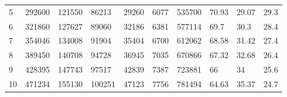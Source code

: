 \begin{landscape}
\begin{table}[tbp]
{\begin{tabular}{@{}llllllllll@{}}
5           & 292600                                                                       & 121550                                                                    & 86213               & 29260                                                                     & 6077                                                                    & 535700       & 70.93                    & 29.07                    & 29.3                           \\
6           & 321860                                                                       & 127627                                                                    & 89060               & 32186                                                                     & 6381                                                                    & 577114       & 69.7                     & 30.3                     & 28.4                           \\
7           & 354046                                                                       & 134008                                                                    & 91904               & 35404                                                                     & 6700                                                                    & 612062       & 68.58                    & 31.42                    & 27.4                           \\
8           & 389450                                                                       & 140708                                                                    & 94728               & 36945                                                                     & 7035                                                                    & 670866       & 67.32                    & 32.68                    & 26.4                           \\
9           & 428395                                                                       & 147743                                                                    & 97517               & 42839                                                                     & 7387                                                                    & 723881       & 66                       & 34                       & 25.6                           \\
10          & 471234                                                                       & 155130                                                                    & 100251              & 47123                                                                     & 7756                                                                    & 781494       & 64.63                    & 35.37                    & 24.7                           \\

\end{tabular}}
\end{table}
\end{landscape}
